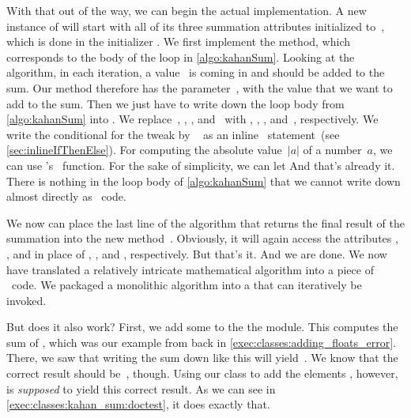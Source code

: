 With that out of the way, we can begin the actual implementation.
A new instance of  will start with all of its three summation attributes initialized to~, which is done in the initializer .
We first implement the  method, which corresponds to the body of the loop in \cref{algo:kahanSum}.
Looking at the algorithm, in each iteration, a value~ is coming in and should be added to the sum.
Our  method therefore has the parameter~, with the value that we want to add to the sum.
Then we just have to write down the loop body from \cref{algo:kahanSum} into .
We replace~, , , and~ with , , , and~, respectively.
We write the conditional for the tweak by \citeauthor{N1974REVZSES}~\cite{N1974REVZSES} as an inline ~statement~(see \cref{sec:inlineIfThenElse}).
For computing the absolute value~$|a|$ of a number~$a$, we can use \python's ~function.
For the sake of simplicity, we can let
And that's already it.
There is nothing in the loop body of \cref{algo:kahanSum} that we cannot write down almost directly as \python\ code.

We now can place the last line of the algorithm that returns the final result of the summation into the new method~.
Obviously, it will again access the attributes , , and  in place of , , and , respectively.
But that's it.
And we are done.
We now have translated a relatively intricate mathematical algorithm into a piece of \python\ code.
We packaged a monolithic algorithm into a  that can iteratively be invoked.

But does it also work?
First, we add some  to the  the module.
This  computes the sum of , which was our example from back in \cref{exec:classes:adding_floats_error}.
There, we saw that writing the sum down like this will yield~.
We know that the correct result should be~, though.
Using our  class to add the elements \pythonil{[1e18, 1, 1e36, -1e36, -1e18]}, however, is \emph{supposed} to yield this correct result.
As we can see in \cref{exec:classes:kahan_sum:doctest}, it does exactly that.

